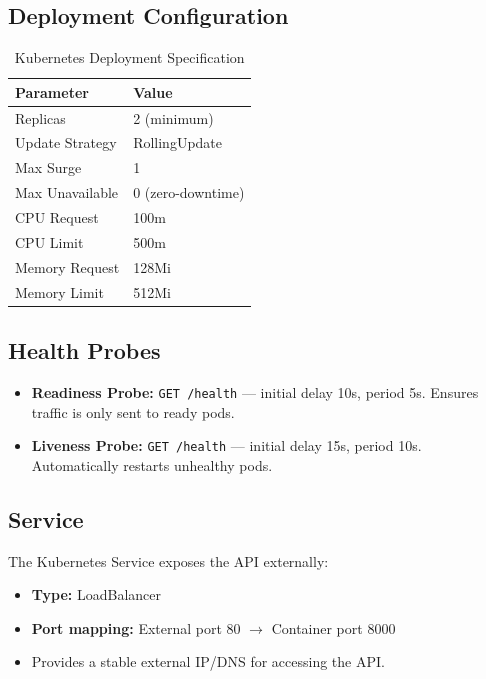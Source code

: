 \documentclass[12pt,a4paper]{article}
\begin{document}
\subsection{Deployment Configuration}

\begin{table}[H]
\centering
\caption{Kubernetes Deployment Specification}
\begin{tabular}{@{}ll@{}}
\toprule
\textbf{Parameter} & \textbf{Value} \\
\midrule
Replicas & 2 (minimum) \\
Update Strategy & RollingUpdate \\
Max Surge & 1 \\
Max Unavailable & 0 (zero-downtime) \\
CPU Request & 100m \\
CPU Limit & 500m \\
Memory Request & 128Mi \\
Memory Limit & 512Mi \\
\bottomrule
\end{tabular}
\end{table}

\subsection{Health Probes}

\begin{itemize}
    \item \textbf{Readiness Probe:} \texttt{GET /health} --- initial delay 10s, period 5s. Ensures traffic is only sent to ready pods.
    \item \textbf{Liveness Probe:} \texttt{GET /health} --- initial delay 15s, period 10s. Automatically restarts unhealthy pods.
\end{itemize}

\subsection{Service}

The Kubernetes Service exposes the API externally:

\begin{itemize}
    \item \textbf{Type:} LoadBalancer
    \item \textbf{Port mapping:} External port 80 $\rightarrow$ Container port 8000
    \item Provides a stable external IP/DNS for accessing the API.
\end{itemize}
\end{document}
